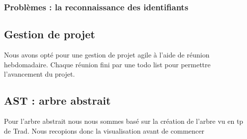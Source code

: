 \documentclass[11pt,a4paper,titlepage]{article}
\begin{document}
\subsubsection*{Problèmes : la reconnaissance des identifiants}


\subsection*{Gestion de projet}

Nous avons opté pour une gestion de projet agile à l'aide de réunion hebdomadaire. Chaque réunion fini par une todo list pour permettre l'avancement du projet.

\subsection*{AST : arbre abstrait}

Pour l'arbre abstrait nous nous sommes basé sur la création de l'arbre vu en tp de Trad. Nous recopions donc la visualisation avant de commencer
\end{document}
